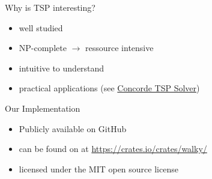 \begin{frame}{Why is TSP interesting?}
  \begin{itemize}
    \item well studied
    \item NP-complete $\rightarrow$ ressource intensive
    \item intuitive to understand
    \pause
    \item practical applications (see \href{https://en.wikipedia.org/wiki/Concorde_TSP_Solver}{Concorde TSP Solver})
  \end{itemize}
\end{frame}

\begin{frame}{Our Implementation}
  \begin{itemize}
    \item Publicly available on GitHub
    \item can be found on at \url{https://crates.io/crates/walky/}
    \item licensed under the MIT open source license
  \end{itemize}
\end{frame}

